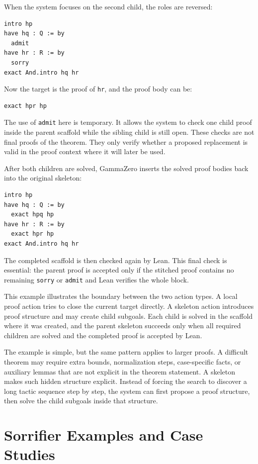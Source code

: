 \documentclass[en]{uet_awesome_thesis/uet-awesome-thesis}
\begin{document}
\begin{appendices}
When the system focuses on the second child, the roles are reversed:
\begin{verbatim}
intro hp
have hq : Q := by
  admit
have hr : R := by
  sorry
exact And.intro hq hr
\end{verbatim}

Now the target is the proof of \texttt{hr}, and the proof body can be:
\begin{verbatim}
exact hpr hp
\end{verbatim}

The use of \texttt{admit} here is temporary. It allows the system to check one child proof inside the
parent scaffold while the sibling child is still open. These checks are not final proofs of the theorem.
They only verify whether a proposed replacement is valid in the proof context where it will later be used.

After both children are solved, GammaZero inserts the solved proof bodies back into the original skeleton:
\begin{verbatim}
intro hp
have hq : Q := by
  exact hpq hp
have hr : R := by
  exact hpr hp
exact And.intro hq hr
\end{verbatim}

The completed scaffold is then checked again by Lean. This final check is essential: the parent proof is
accepted only if the stitched proof contains no remaining \texttt{sorry} or \texttt{admit} and Lean verifies
the whole block.

This example illustrates the boundary between the two action types. A local proof action tries to close
the current target directly. A skeleton action introduces proof structure and may create
child subgoals. Each child is solved in the scaffold where it was created, and the parent skeleton succeeds
only when all required children are solved and the completed proof is accepted by Lean.

The example is simple, but the same pattern applies to larger proofs. A difficult theorem may require
extra bounds, normalization steps, case-specific facts, or auxiliary lemmas that are not explicit in
the theorem statement. A skeleton makes such hidden structure explicit. Instead of forcing the search to
discover a long tactic sequence step by step, the system can first propose a proof structure, then solve the
child subgoals inside that structure.

\chapter{Sorrifier Examples and Case Studies}
\label{app:sorrifier-examples}


\end{appendices}
\end{document}
